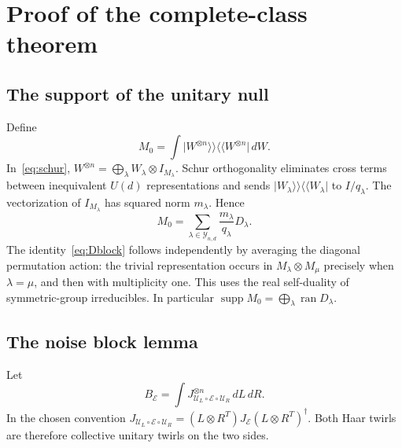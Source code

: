 \documentclass[11pt,a4paper]{article}
\theoremstyle{remark}\newtheorem{remark}[theorem]{Remark}
\DeclareMathOperator{\supp}{supp}
\newcommand{\cE}{\mathcal E}
\newcommand{\cU}{\mathcal U}
\newcommand{\cY}{\mathcal Y_{n,d}}
\newcommand{\dket}[1]{\lvert #1\rangle\!\rangle}
\newcommand{\dbra}[1]{\langle\!\langle #1\rvert}
\begin{document}
\section{Proof of the complete-class theorem}
\subsection{The support of the unitary null}
Define
\begin{equation}
 M_0=\int\dket{W^{\otimes n}}\dbra{W^{\otimes n}}\,dW.
\end{equation}
In~\eqref{eq:schur}, $W^{\otimes n}=\bigoplus_\lambda W_\lambda\otimes I_{M_\lambda}$. Schur orthogonality eliminates cross terms between inequivalent $U(d)$ representations and sends $\dket{W_\lambda}\dbra{W_\lambda}$ to $I/q_\lambda$. The vectorization of $I_{M_\lambda}$ has squared norm $m_\lambda$. Hence
\begin{equation}\label{eq:M0}
 M_0=\sum_{\lambda\in\cY}\frac{m_\lambda}{q_\lambda}D_\lambda.
\end{equation}
The identity~\eqref{eq:Dblock} follows independently by averaging the diagonal permutation action: the trivial representation occurs in $M_\lambda\otimes M_\mu$ precisely when $\lambda=\mu$, and then with multiplicity one. This uses the real self-duality of symmetric-group irreducibles. In particular $\supp M_0=\bigoplus_\lambda\operatorname{ran}D_\lambda$.

\subsection{The noise block lemma}
Let
\begin{equation}
 B_{\cE}=\int J_{\cU_L\circ\cE\circ\cU_R}^{\otimes n}\,dL\,dR.
\end{equation}
In the chosen convention $J_{\cU_L\circ\cE\circ\cU_R}=(L\otimes R^T)J_{\cE}(L\otimes R^T)^\dagger$. Both Haar twirls are therefore collective unitary twirls on the two sides.
\end{document}
